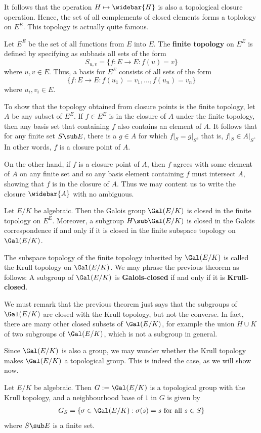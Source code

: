 It follows that the operation $H\mapsto\widebar{H}$ is also a topological closure operation. Hence, the set of all complements of closed elements forms a toplology on $E^E$. This topology is actually quite famous.
\begin{definition}
Let $E^E$ be the set of all functions from $E$ into $E$. The \textbf{finite topology} on $E^E$ is defined by specifying as subbasis all sets of the form
\[S_{u,v}=\{f:E\to E:f(u)=v\}\]
where $u,v\in E$. Thus, a basis for $E^E$ consists of all sets of the form
\[\{f:E\to E:f(u_1)=v_1,\dots,f(u_n)=v_n\}\]
where $u_i,v_i\in E$.
\end{definition}
To show that the topology obtained from closure points is the finite topology, let $A$ be any subset of $E^E$. If $f\in E^E$ is in the closure of $A$ under the finite topology, then any basis set that containing $f$ also contains an element of $A$. It follows that for any finite set $S\sub E$, there is a $g\in A$ for which $f|_S=g|_S$, that
is, $f|_S\in A|_S$. In other words, $f$ is a closure point of $A$.\par
On the other hand, if $f$ is a closure point of $A$, then $f$ agrees with some element of $A$ on any finite set and so any basis element containing $f$ must intersect $A$, showing that $f$ is in the closure of $A$. Thus we may content us to write the closure $\widebar{A}$ with no ambiguous.
\begin{theorem}
Let $E/K$ be algebraic. Then the Galois group $\Gal(E/K)$ is closed in the finite topology on $E^E$. Moreover, a subgroup $H\sub\Gal(E/K)$ is closed in the Galois correspondence if and only if it is closed in the finite
subspace topology on $\Gal(E/K)$.
\end{theorem}
The subspace topology of the finite topology inherited by $\Gal(E/K)$ is called the Krull topology on $\Gal(E/K)$. We may phrase the previous theorem as follows: A subgroup of $\Gal(E/K)$ is \textbf{Galois-closed} if and only if it is \textbf{Krull-closed}.\par
We must remark that the previous theorem just says that the subgroups of $\Gal(E/K)$ are closed with the Krull topology, but not the converse. In fact, there are many other closed subsets of $\Gal(E/K)$, for example the union $H\cup K$ of two subgroups of $\Gal(E/K)$, which is not a subgroup in general.\par
Since $\Gal(E/K)$ is also a group, we may wonder whether the Krull topology makes $\Gal(E/K)$ a topological group. This is indeed the case, as we will show now.
\begin{proposition}
Let $E/K$ be algebraic. Then $G:=\Gal(E/K)$ is a topological group with the Krull topology, and a neighbourhood base of $1$ in $G$ is given by
\begin{align}\label{Galois group basis for 1}
G_S=\{\sigma\in\Gal(E/K):\sigma(s)=s\text{ for all }s\in S\}
\end{align}
where $S\sub E$ is a finite set.
\end{proposition}

